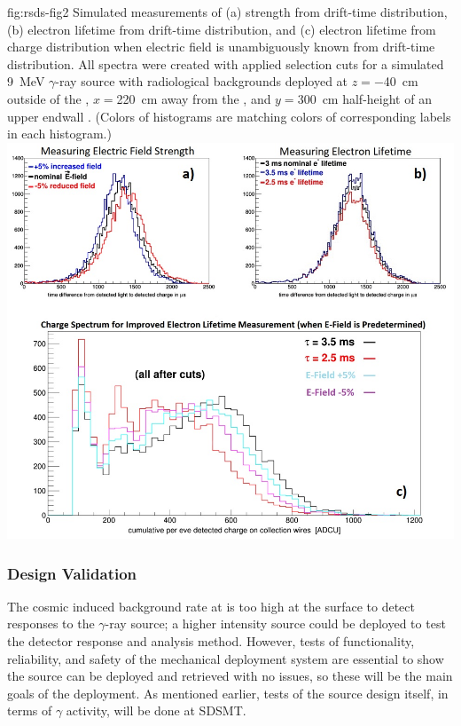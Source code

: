 \begin{dunefigure}
{fig:rsds-fig2}
{Simulated measurements of (a) \efield strength from drift-time distribution, (b) electron lifetime from drift-time distribution, and (c) electron lifetime from charge distribution when electric field is unambiguously known from drift-time distribution. All spectra were created with applied selection cuts for a simulated \SI{9}{\MeV} $\gamma$-ray source with radiological backgrounds deployed at $z=$\SI{-40}{\cm} outside of the , $x=$\SI{220}{\cm} away from the , and $y=$\SI{300}{\cm} half-height of an upper endwall . (Colors of histograms are matching colors of corresponding labels in each histogram.)}
\centering
\includegraphics[width=0.9\linewidth]{graphics/9MeVgamma_withBG_EfieldDriftTimes_eLifetime_chargeSpectrum_cut_nicer2.jpg}    
\end{dunefigure}

\subsubsection{ Design Validation}
The cosmic induced background rate at  is too high at the surface to detect responses to the  $\gamma$-ray source; a higher intensity source could be deployed to test the detector response and analysis method. However, tests of functionality,  reliability, and safety of the mechanical deployment system are essential to show the source can be deployed and retrieved with no issues, so these will be the main goals of the  deployment. As mentioned earlier, tests of the source design itself, in terms of $\gamma$ activity, will be done at SDSMT. 

